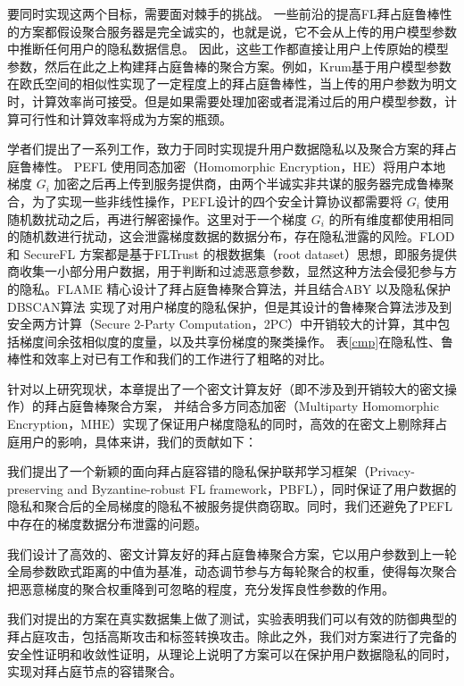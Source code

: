 要同时实现这两个目标，需要面对棘手的挑战。
一些前沿的提高FL拜占庭鲁棒性的方案\cite{blanchard2017machine, guerraoui2018hidden, yin2018byzantine}都假设聚合服务器是完全诚实的，也就是说，它不会从上传的用户模型参数中推断任何用户的隐私数据信息。
因此，这些工作都直接让用户上传原始的模型参数，然后在此之上构建拜占庭鲁棒的聚合方案。例如，Krum\cite{blanchard2017machine}基于用户模型参数在欧氏空间的相似性实现了一定程度上的拜占庭鲁棒性，当上传的用户参数为明文时，计算效率尚可接受。但是如果需要处理加密或者混淆过后的用户模型参数，计算可行性和计算效率将成为方案的瓶颈。

学者们提出了一系列工作\cite{liu2021privacy, dong2021flod, nguyen2022flame, hao2021efficient, so2020byzantine}，致力于同时实现提升用户数据隐私以及聚合方案的拜占庭鲁棒性。
PEFL\cite{liu2021privacy} 使用同态加密（Homomorphic Encryption，HE）将用户本地梯度 $G_i$ 加密之后再上传到服务提供商，由两个半诚实非共谋的服务器完成鲁棒聚合，为了实现一些非线性操作，PEFL设计的四个安全计算协议都需要将 $G_i$ 使用随机数扰动之后，再进行解密操作。这里对于一个梯度 $G_i$ 的所有维度都使用相同的随机数进行扰动，这会泄露梯度数据的数据分布，存在隐私泄露的风险。FLOD \cite{dong2021flod} 和 SecureFL \cite{hao2021efficient} 方案都是基于FLTrust \cite{DBLP:conf/ndss/CaoF0G21} 的根数据集（root dataset）思想，即服务提供商收集一小部分用户数据，用于判断和过滤恶意参数，显然这种方法会侵犯参与方的隐私。FLAME \cite{nguyen2022flame} 精心设计了拜占庭鲁棒聚合算法，并且结合ABY\cite{demmler2015aby} 以及隐私保护DBSCAN算法 \cite{bozdemir2021privacy} 实现了对用户梯度的隐私保护，但是其设计的鲁棒聚合算法涉及到安全两方计算（Secure 2-Party Computation，2PC）中开销较大的计算，其中包括梯度间余弦相似度的度量，以及共享份梯度的聚类操作。
表\ref{cmp}在隐私性、鲁棒性和效率上对已有工作和我们的工作进行了粗略的对比。

针对以上研究现状，本章提出了一个密文计算友好（即不涉及到开销较大的密文操作）的拜占庭鲁棒聚合方案，
并结合多方同态加密（Multiparty Homomorphic Encryption，MHE）实现了保证用户梯度隐私的同时，高效的在密文上剔除拜占庭用户的影响，具体来讲，我们的贡献如下：
\begin{compactenum}
	\item  我们提出了一个新颖的面向拜占庭容错的隐私保护联邦学习框架（Privacy-preserving and Byzantine-robust FL framework，PBFL），同时保证了用户数据的隐私和聚合后的全局梯度的隐私不被服务提供商窃取。同时，我们还避免了PEFL\cite{liu2021privacy}中存在的梯度数据分布泄露的问题。
	\item 我们设计了高效的、密文计算友好的拜占庭鲁棒聚合方案，它以用户参数到上一轮全局参数欧式距离的中值为基准，动态调节参与方每轮聚合的权重，使得每次聚合把恶意梯度的聚合权重降到可忽略的程度，充分发挥良性参数的作用。
	\item 我们对提出的方案在真实数据集上做了测试，实验表明我们可以有效的防御典型的拜占庭攻击，包括高斯攻击和标签转换攻击。除此之外，我们对方案进行了完备的安全性证明和收敛性证明，从理论上说明了方案可以在保护用户数据隐私的同时，实现对拜占庭节点的容错聚合。
\end{compactenum}

